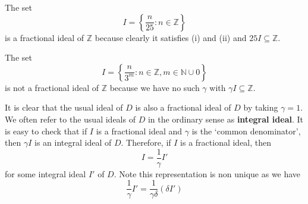 \begin{example} The set
$$I=\left\{\frac{n}{25}: n \in \mathbb{Z} \right\}$$
is a fractional ideal of $\mathbb{Z}$ because clearly it satisfies (i) and (ii) and $25I \subseteq \mathbb{Z}$.
\end{example}
\begin{example} The set
$$I=\left\{\frac{n}{3^m}: n \in \mathbb{Z}, m \in \mathbb{N} \cup {0} \right\}$$
is not a fractional ideal of $\mathbb{Z}$ because we have no such $\gamma$ with $\gamma I \subseteq \mathbb{Z}$.
\end{example}
It is clear that the usual ideal of $D$ is also a fractional ideal of $D$ by taking $\gamma =1$. We often refer to the usual ideals of $D$ in the ordinary sense as {\bf integral ideal}. It is easy to check that if $I$ is a fractional ideal and $\gamma$ is the `common denominator', then $\gamma I$ is an integral ideal of $D$. Therefore,
if $I$ is a fractional ideal, then
$$I=\frac{1}{\gamma}I'$$
for some integral ideal $I'$ of $D$. Note this representation is non unique as we have
$$\frac{1}{\gamma}I'=\frac{1}{\gamma \delta}(\delta I')$$

